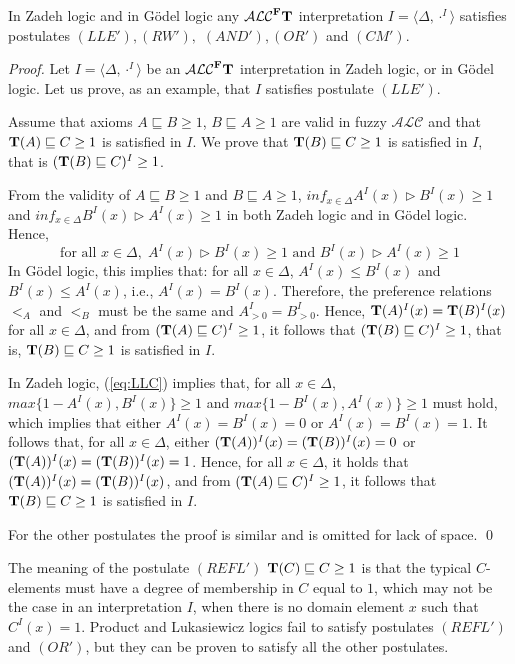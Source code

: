\documentclass[runningheads]{llncs}
\newcommand{\tip}{{\bf T}}
\newcommand{\alc}{\mathcal{ALC}}
\newcommand{\alcFt}{\mathcal{ALC}^{\Fe}\tip}
\newcommand {\Fe} {{\bf F}}
\begin{document}
\begin{proposition} \label{prop:KLM_properties}
In Zadeh logic and in G\"odel logic any $\alcFt$ interpretation $I=\langle \Delta, \cdot^I \rangle $
satisfies postulates $(LLE'), (RW'),$ $ (AND'), (OR')$ and $(CM')$.


\end{proposition} 
\begin{proof}
Let  $I= \langle \Delta, \cdot^I \rangle$ be an $\alcFt$ interpretation 
in Zadeh logic, or in G\"odel logic.
Let us prove, as an example, that $I$ satisfies postulate $(LLE')$.  %

\noindent
Assume that axioms $A \sqsubseteq B \geq 1$, $B \sqsubseteq A \geq 1$ are valid in fuzzy $\alc$ and that $\tip(A) \sqsubseteq C \geq 1 $ is satisfied in $I$.  
We prove that $\tip(B) \sqsubseteq C \geq 1$ is satisfied in $I$, that is $(\tip(B) \sqsubseteq C)^I \geq 1$.


From the validity of $A \sqsubseteq B \geq 1$ and $B \sqsubseteq A \geq 1$,  
$inf_{x \in \Delta} A^I(x) \rhd B^I(x) \geq 1$ and $inf_{x \in \Delta} B^I(x) \rhd A^I(x) \geq 1$ in both Zadeh logic and in G\"odel logic.
Hence,
\begin{equation}\label{eq:LLC}
\mbox{for all } x \in \Delta, \; A^I(x) \rhd B^I(x) \geq 1 \mbox{ and } B^I(x) \rhd A^I(x) \geq 1
\end{equation}
In G\"odel logic, this implies that: for all $x \in \Delta$, $A^I(x) \leq B^I(x)$ and $B^I(x) \leq A^I(x)$, i.e., $A^I(x) = B^I(x)$. %
Therefore, the preference relations $<_A$ and $<_B$ must be the same and $A^I_{>0}= B^I_{>0}$.
Hence, $\tip(A)^I(x) = \tip(B)^I(x)$ for all $x \in \Delta$, and from $(\tip(A) \sqsubseteq C)^I \geq 1 $, it follows that $(\tip(B) \sqsubseteq C)^I \geq 1 $, that is,  $\tip(B) \sqsubseteq C \geq 1$ is satisfied in $I$.

In Zadeh logic,  (\ref{eq:LLC}) implies that, for all $x \in \Delta$, $max\{1-A^I(x), B^I(x)\}\geq 1$ and $max\{1-B^I(x), A^I(x)\}\geq 1$ must hold, which implies that 
either  $A^I(x)=B^I(x)=0$ or $A^I(x)=B^I(x)=1$.
It follows that, for all $x \in \Delta$, either  $(\tip(A))^I(x)=(\tip(B))^I(x)=0$ or  $(\tip(A))^I(x)=(\tip(B))^I(x)=1$.
Hence, for all $x \in \Delta$,  it holds that $(\tip(A))^I(x)=(\tip(B))^I(x)$, and from $(\tip(A) \sqsubseteq C)^I \geq 1 $, it follows that $\tip(B) \sqsubseteq C \geq 1$ is satisfied in $I$. 

For the other postulates the proof is similar and  is omitted for lack of space.
\qed
\end{proof}
The meaning of the postulate  $(REFL')$ $\tip(C) \sqsubseteq C \geq 1$ is that the typical $C$-elements must have a degree of membership in $C$ equal to $1$, which may not be the case in an interpretation $I$, when there is no domain element $x$ such that $C^I(x)=1$.
Product and Lukasiewicz logics fail to satisfy postulates $(REFL')$ and $(OR')$, but they can be proven to satisfy  
all the other postulates.
\end{document}
